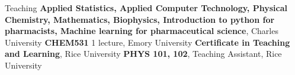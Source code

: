 \begin{rubric}{Teaching}
%
%
  \textbf{Applied Statistics, Applied Computer Technology, Physical Chemistry, Mathematics, Biophysics, Introduction to python for pharmacists, Machine learning for pharmaceutical science}, Charles University
\entry*[\hspace{1.05cm}2021]%
  \textbf{CHEM531} 1 lecture, Emory University
\entry*[\hspace{1.05cm}2020]%
  \textbf{Certificate in Teaching and Learning}, Rice University
\entry*[2015 -- 2016]%
  \textbf{PHYS 101, 102}, Teaching Assistant, Rice University
\end{rubric}

